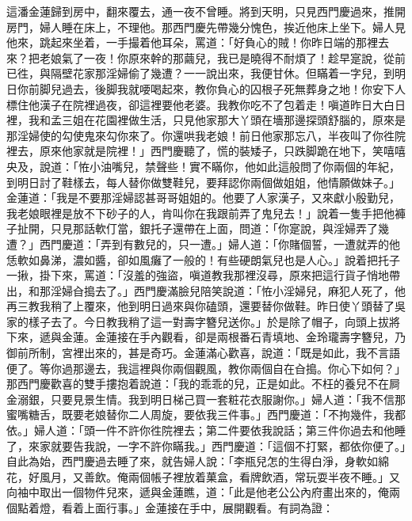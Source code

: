 這潘金蓮歸到房中，翻來覆去，通一夜不曾睡。將到天明，只見西門慶過來，推開房門，婦人睡在床上，不理他。那西門慶先帶幾分愧色，挨近他床上坐下。婦人見他來，跳起來坐着，一手撮着他耳朵，罵道：「好負心的賊！你昨日端的那裡去來？把老娘氣了一夜！你原來幹的那繭兒，我已是曉得不耐煩了！{}趁早寔說，從前已徃，與隔壁花家那淫婦偷了幾遭？一一說出來，我便甘休。但瞞着一字兒，到明日你前脚兒過去，後脚我就喓喝起來，教你負心的囚根子死無葬身之地！你安下人標住他漢子在院裡過夜，卻這裡要他老婆。我教你吃不了包着走！嗔道昨日大白日裡，我和孟三姐在花園裡做生活，只見他家那大丫頭在墻那邊探頭舒腦的，原來是那淫婦使的勾使鬼來勾你來了。你還哄我老娘！前日他家那忘八，半夜叫了你徃院裡去，原來他家就是院裡！」西門慶聽了，慌的裝矮子，只跌脚跪在地下，笑嘻嘻央及，{}說道：「恠小油嘴兒，禁聲些！實不瞞你，{}他如此這般問了你兩個的年紀，到明日討了鞋樣去，每人替你做雙鞋兒，要拜認你兩個做姐姐，他情願做妹子。」金蓮道：「我是不要那淫婦認甚哥哥姐姐的。他要了人家漢子，又來獻小殷勤兒，我老娘眼裡是放不下砂子的人，肯叫你在我跟前弄了鬼兒去！」說着一隻手把他褲子扯開，{}只見那話軟仃當，銀托子還帶在上面，問道：「你寔說，與淫婦弄了幾遭？」西門慶道：「弄到有數兒的，只一遭。」婦人道：「你賭個誓，{}一遭就弄的他恁軟如鼻涕，濃如醬，卻如風癱了一般的！有些硬朗氣兒也是人心。」說着把托子一揪，掛下來，罵道：「沒羞的強盜，嗔道教我那裡沒尋，原來把這行貨子悄地帶出，和那淫婦㒲搗去了。」{}西門慶滿臉兒陪笑說道：「恠小淫婦兒，麻犯人死了，他再三教我稍了上覆來，他到明日過來與你磕頭，{}還要替你做鞋。昨日使丫頭替了吳家的樣子去了。今日教我稍了這一對壽字簪兒送你。」於是除了帽子，向頭上拔將下來，遞與金蓮。金蓮接在手內觀看，卻是兩根番石青填地、金玲瓏壽字簪兒，乃御前所制，宮裡出來的，甚是奇巧。金蓮滿心歡喜，說道：「既是如此，我不言語便了。{}等你過那邊去，我這裡與你兩個觀風，教你兩個自在㒲搗。你心下如何？」那西門慶歡喜的雙手摟抱着說道：「我的乖乖的兒，正是如此。不枉的養兒不在屙金溺銀，只要見景生情。我到明日梯己買一套粧花衣服謝你。」婦人道：「我不信那蜜嘴糖舌，既要老娘替你二人周旋，要依我三件事。」西門慶道：「不拘幾件，我都依。」婦人道：「頭一件不許你徃院裡去；第二件要依我說話；第三件你過去和他睡了，來家就要告我說，一字不許你瞞我。」{}西門慶道：「這個不打緊，都依你便了。」自此為始，西門慶過去睡了來，就告婦人說：「李瓶兒怎的生得白淨，身軟如綿花，好風月，又善飲。俺兩個帳子裡放着菓盒，看牌飲酒，常玩耍半夜不睡。」又向袖中取出一個物件兒來，遞與金蓮瞧，道：「此是他老公公內府畫出來的，俺兩個點着燈，看着上面行事。」金蓮接在手中，展開觀看。有詞為證：

